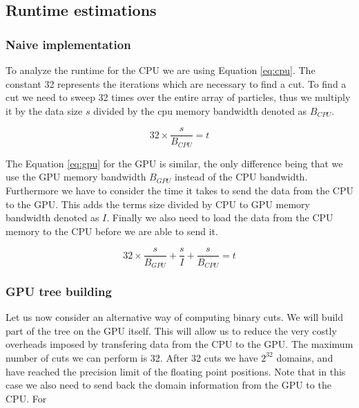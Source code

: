 \documentclass[]{article}
\begin{document}
\subsection{Runtime estimations}


\subsubsection{Naive implementation}

To analyze the runtime for the CPU we are using Equation \ref{eq:cpu}. The constant 32 represents the iterations which are necessary to find a cut. To find a cut we need to sweep 32 times over the entire array of particles, thus we multiply it by the data size $s$ divided by the cpu memory bandwidth denoted as $B_{CPU}$.

\begin{center}
	\begin{equation}
			32 \times \frac{ s }{B_{CPU}} = t
			\label{eq:cpu}
	\end{equation}
\end{center}

\vspace{5mm}


The Equation \ref{eq:gpu} for the GPU is similar, the only difference being that we use the GPU memory bandwidth $B_{GPU}$ instead of the CPU bandwidth. Furthermore we have to consider the time it takes to send the data from the CPU to the GPU. This adds the terms size divided by CPU to GPU memory bandwidth denoted as $I$. Finally we also need to load the data from the CPU memory to the CPU before we are able to send it. 

\begin{center}
	\begin{equation}
		32 \times \frac{s}{B_{GPU}} + \frac{s}{I}  + \frac{s}{B_{CPU}}= t
		\label{eq:gpu}
	\end{equation}
\end{center}

\vspace{5mm}


\subsubsection{GPU tree building}

Let us now consider an alternative way of computing binary cuts. We will build part of the tree on the GPU itself. This will allow us to reduce the very costly overheads imposed by transfering data from the CPU to the GPU. The maximum number of cuts we can perform is 32. After 32 cuts we have $2^{32}$ domains, and have reached the precision limit of the floating point positions. Note that in this case we also need to send back the domain information from the GPU to the CPU. For 
\end{document}
